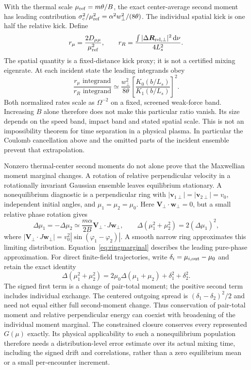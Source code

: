\documentclass[11pt,letterpaper]{article}
\newcommand{\dd}{\mathrm d}
\begin{document}
With the thermal scale $\mu_{\rm ref}=m\theta/B$, the exact center-average
second moment has leading contribution
$\sigma_c^2/\mu_{\rm ref}^2=\alpha^2w_\perp^2/(8\theta)$.
The individual spatial kick is one half the relative kick. Define
\begin{equation}
 r_\mu=\frac{2D_{\mu\mu}}{\mu_{\rm ref}^2},\qquad
 r_R=\frac{\int|\Delta\bm R_{\rm rel,\perp}|^2\,\dd\nu}
                 {4L_s^2}.
 \label{eq:kickrates}
\end{equation}
The spatial quantity is a fixed-distance kick proxy; it is not a certified
mixing eigenrate. At each incident state the leading integrands obey
\begin{equation}
 \frac{r_\mu\text{ integrand}}{r_R\text{ integrand}}
 \simeq \frac{w_\perp^2}{8\theta}
       \left[\frac{K_0(b/L_s)}{K_1(b/L_s)}\right]^2.
 \label{eq:kickrateratio}
\end{equation}
Both normalized rates scale as $\Omega^{-2}$ on a fixed, screened weak-force
band. Increasing $B$ alone therefore does not make this particular ratio
vanish. Its size depends on the speed band, impact band and stated spatial
scale. This is not an impossibility theorem for time separation in a
physical plasma. In particular the Coulomb cancellation above and the
omitted parts of the incident ensemble prevent that extrapolation.

Nonzero thermal-center second moments do not alone prove that the
Maxwellian moment marginal changes. A rotation of relative perpendicular
velocity in a rotationally invariant Gaussian ensemble leaves equilibrium
stationary. A nonequilibrium diagnostic is a perpendicular ring with
$|\bm v_{1\perp}|=|\bm v_{2\perp}|=v_0$, independent initial angles, and
$\mu_1=\mu_2=\mu_0$. Here $\bm V_\perp\cdot\bm w_\perp=0$, but a
small relative phase rotation gives
\begin{equation}
 \Delta\mu_1=-\Delta\mu_2
 \simeq\frac{m\alpha}{2B}\bm V_\perp\cdot J\bm w_\perp,
 \qquad
 \Delta(\mu_1^2+\mu_2^2)=2(\Delta\mu_1)^2,
 \label{eq:ringmarginal}
\end{equation}
where $|\bm V_\perp\cdot J\bm w_\perp|=
 v_0^2|\sin(\varphi_1-\varphi_2)|$. A smooth narrow ring approximates
this limiting distribution. Equation~\eqref{eq:ringmarginal} describes the
leading pure-phase approximation. For direct finite-field trajectories,
write $\delta_i=\mu_{i,\rm out}-\mu_0$ and retain the exact identity
\begin{equation}
 \Delta(\mu_1^2+\mu_2^2)
 =2\mu_0\Delta(\mu_1+\mu_2)+\delta_1^2+\delta_2^2.
 \label{eq:ringdirectbudget}
\end{equation}
The signed first term is a change of pair-total moment; the positive
second term includes individual exchange. The centered outgoing spread is
$(\delta_1-\delta_2)^2/2$ and need not equal either full second-moment
change. Thus conservation of pair-total moment and
relative perpendicular energy can coexist with broadening of the individual
moment marginal. The constrained closure conserves every represented
$G(\mu)$ exactly. Its physical applicability to such a nonequilibrium
population therefore needs a distribution-level error estimate over its
actual mixing time, including the signed drift and correlations, rather
than a zero equilibrium mean or a small per-encounter increment.
\end{document}
